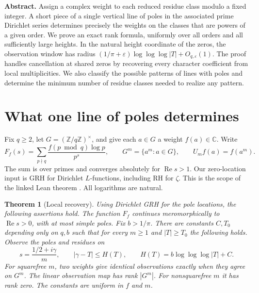 \documentclass[11pt,letterpaper]{article}
\newtheorem{theorem}{Theorem}\newtheorem{corollary}[theorem]{Corollary}
\newcommand{\C}{\mathbb C}\newcommand{\R}{\mathbb R}\newcommand{\Z}{\mathbb Z}
\newcommand{\re}{\operatorname{Re}}\newcommand{\e}{\mathrm e}\newcommand{\dd}{\,\mathrm d}
\begin{document}
\thispagestyle{plain}
\par
\vspace{.55em}
\par
\vspace{.4em}
\par
\vspace{.65em}
\noindent\textbf{Abstract.}
Assign a complex weight to each reduced residue class modulo a fixed integer. A short piece of a single vertical line of poles in the associated prime Dirichlet series determines precisely the weights on the classes that are powers of a given order. We prove an exact rank formula, uniformly over all orders and all sufficiently large heights. In the natural height coordinate of the zeros, the observation window has radius $(1/\pi+\varepsilon)\log\log\log |T|+O_{q,\varepsilon}(1)$. The proof handles cancellation at shared zeros by recovering every character coefficient from local multiplicities. We also classify the possible patterns of lines with poles and determine the minimum number of residue classes needed to realize any pattern.

\section{What one line of poles determines}
Fix $q\ge2$, let $G=(\Z/q\Z)^\times$, and give each $a\in G$ a weight $f(a)\in\C$. Write
\begin{equation}
 F_f(s)=\sum_{p\nmid q}\frac{f(p\bmod q)\log p}{p^s},\qquad
 G^m=\{a^m:a\in G\},\qquad U_m f(a)=f(a^m).
 \label{eq:series}
\end{equation}
The sum is over primes and converges absolutely for $\re s>1$. Our zero-location input is GRH for Dirichlet $L$-functions, including RH for $\zeta$. This is the scope of the linked Lean theorem \cite{lean}. All logarithms are natural.

\begin{theorem}[Local recovery]\label{thm:main}
Using Dirichlet GRH for the pole locations, the following assertions hold. The function $F_f$ continues meromorphically to $\re s>0$, with at most simple poles. Fix $b>1/\pi$. There are constants $C,T_0$ depending only on $q,b$ such that for every $m\ge1$ and $|T|\ge T_0$ the following holds. Observe the poles and residues on
\begin{equation}
  s=\frac{1/2+i\gamma}{m},\qquad
  |\gamma-T|\le H(T),\qquad H(T)=b\log\log\log|T|+C.
  \label{eq:window}
\end{equation}
For squarefree $m$, two weights give identical observations exactly when they agree on $G^m$. The linear observation map has rank $|G^m|$. For nonsquarefree $m$ it has rank zero. The constants are uniform in $f$ and $m$.
\end{theorem}
\end{document}
